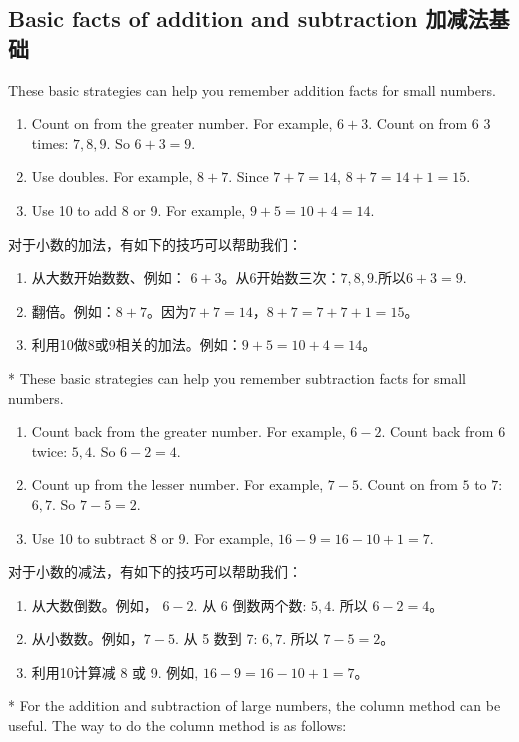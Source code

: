 \subsection{Basic facts of addition and subtraction 加减法基础}
\begin{paracol}{2}
These basic strategies can help you remember addition facts for small numbers.
\begin{enumerate}
\item Count on from the greater number. For example, $6+3$. Count on from $6$ 3 times: $7,8,9$. So $6+3=9$.
\item Use doubles. For example, $8+7$. Since $7+7=14$, $8+7 = 14+1=15$.
\item Use 10 to add 8 or 9. For example, $9+5 = 10+4 = 14$.
\end{enumerate}
\switchcolumn[1]
对于小数的加法，有如下的技巧可以帮助我们：
\begin{enumerate}
\item 从大数开始数数、例如： $6+3$。从$6$开始数三次：$7,8,9$.所以$6+3=9$.
\item 翻倍。例如：$8+7$。因为$7+7=14$，$8+7=7+7+1=15$。
\item 利用10做8或9相关的加法。例如：$9+5=10+4=14$。
\end{enumerate}
\switchcolumn[0]*
These basic strategies can help you remember subtraction facts for small numbers.
\begin{enumerate}
\item Count back from the greater number. For example, $6-2$. Count back from $6$ twice: $5,4$. So $6-2=4$.
\item Count up from the lesser number. For example, $7-5$. Count on from $5$ to $7$: $6,7$. So $7-5=2$.
\item Use 10 to subtract 8 or 9. For example, $16-9 = 16-10+1 = 7$.
\end{enumerate}
\switchcolumn[1]
对于小数的减法，有如下的技巧可以帮助我们：
\begin{enumerate}
\item 从大数倒数。例如， $6-2$. 从 $6$ 倒数两个数: $5,4$. 所以 $6-2=4$。
\item 从小数数。例如，$7-5$. 从 5 数到 7: $6,7$. 所以 $7-5=2$。
\item 利用10计算减 8 或 9. 例如, $16-9 = 16-10+1 = 7$。
\end{enumerate}
\switchcolumn[0]*
For the addition and subtraction of large numbers, the column method can be useful. The way to do the column method is as follows:
\begin{description}

\end{description}
\end{paracol}
